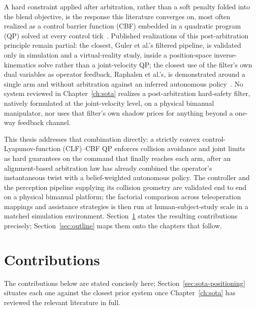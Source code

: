 \documentclass[12pt,a4paper,twoside,openright]{report}
\begin{document}
A hard constraint applied after arbitration, rather than a soft penalty folded into the blend objective, is the response this literature converges on, most often realized as a control barrier function (CBF) embedded in a quadratic program (QP) solved at every control tick~\cite{ames2017cbf}. Published realizations of this post-arbitration principle remain partial: the closest, Guler et al.'s filtered pipeline, is validated only in simulation and a virtual-reality study, inside a position-space inverse-kinematics solve rather than a joint-velocity QP; the closest use of the filter's own dual variables as operator feedback, Raphalen et al.'s, is demonstrated around a single arm and without arbitration against an inferred autonomous policy~\cite{raphalen2026feeling}. No system reviewed in Chapter~\ref{ch:sota} realizes a post-arbitration hard-safety filter, natively formulated at the joint-velocity level, on a physical bimanual manipulator, nor uses that filter's own shadow prices for anything beyond a one-way feedback channel.

This thesis addresses that combination directly: a strictly convex control-Lyapunov-function (CLF)--CBF QP enforces collision avoidance and joint limits as hard guarantees on the command that finally reaches each arm, after an alignment-based arbitration law has already combined the operator's instantaneous twist with a belief-weighted autonomous policy. The controller and the perception pipeline supplying its collision geometry are validated end to end on a physical bimanual platform; the factorial comparison across teleoperation mappings and assistance strategies is then run at human-subject-study scale in a matched simulation environment. Section~\ref{sec:contributions} states the resulting contributions precisely; Section~\ref{sec:outline} maps them onto the chapters that follow.

\section{Contributions}
\label{sec:contributions}

The contributions below are stated concisely here; Section~\ref{sec:sota-positioning} situates each one against the closest prior system once Chapter~\ref{ch:sota} has reviewed the relevant literature in full.
\end{document}
